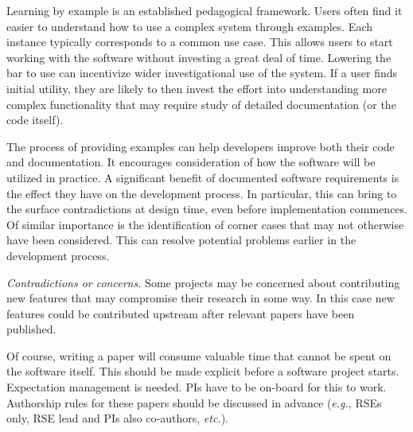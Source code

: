 \documentclass[a4paper,UKenglish]{dagman}
\newcommand{\eg}{\emph{e.g.},\xspace}
\newcommand{\etc}{\emph{etc.}\xspace}
\begin{document}

Learning by example is an established pedagogical framework. Users often find it easier to understand how to use a complex system through examples. Each instance typically corresponds to a common use case. This allows users to start working with the software without investing a great deal of time. Lowering the bar to use can incentivize wider investigational use of the system. If a user finds initial utility, they are likely to then invest the effort into understanding more complex functionality that may require study of detailed documentation (or the code itself).

The process of providing examples can help developers improve both their code and documentation. It encourages consideration of how the software will be utilized in practice. A significant benefit of documented software requirements is the effect they have on the development process. In particular, this can bring to the surface contradictions at design time, even before implementation commences. Of similar importance is the identification of corner cases that may not otherwise have been considered. This can resolve potential problems earlier in the development process.

\emph{Contradictions or concerns.}
Some projects may be concerned about contributing new features that may compromise their research in some way. In this case new features could be contributed upstream after relevant papers have been published.

Of course, writing a paper will consume valuable time that cannot be spent on the software itself. This should be made explicit before a software project starts. Expectation management is needed. PIs have to be on-board for this to work. Authorship rules for these papers should be discussed in advance (\eg RSEs only, RSE lead and PIs also co-authors, \etc).
\end{document}
